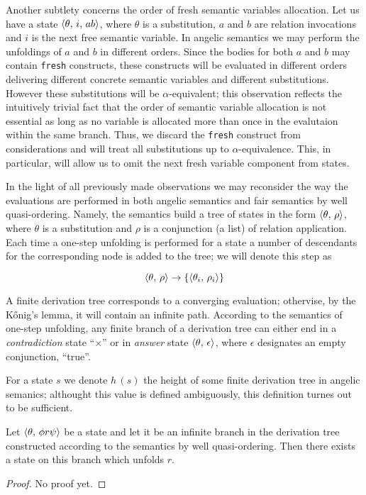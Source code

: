 Another subtlety concerns the order of fresh semantic variables allocation. Let us have a state $\langle \theta,\,i,\,ab \rangle$, where
$\theta$ is a substitution, $a$ and $b$ are relation invocations and $i$ is the next free semantic variable. In angelic semantics we
may perform the unfoldings of $a$ and $b$ in different orders. Since the bodies for both $a$ and $b$ may contain \lstinline|fresh| constructs,
these constructs will be evaluated in different orders delivering different concrete semantic variables and different substitutions. However
these substitutions will be $\alpha$-equivalent; this observation reflects the intuitively trivial fact that the order of semantic variable
allocation is not essential as long as no variable is allocated more than once in the evalutaion within the same branch. Thus, we discard
the \lstinline|fresh| construct from considerations and will treat all substitutions up to $\alpha$-equivalence. This, in particular,
will allow us to omit the next fresh variable component from states.

In the light of all previously made observations we may reconsider the way the evaluations are performed in both
angelic semantics and fair semantics by well quasi-ordering. Namely, the semantics build a tree of states in the form
$\langle \theta,\,\rho \rangle$, where $\theta$ is a substitution and $\rho$ is a conjunction (a list) of relation application.
Each time a one-step unfolding is performed for a state a number of descendants for the corresponding node is
added to the tree; we will denote this step as

\[
\langle \theta,\,\rho \rangle\to\{\langle \theta_i,\,\rho_i \rangle\}
\]

A finite derivation tree corresponds to a converging evaluation; othervise, by the K\H{o}nig's lemma, it will contain an infinite path. 
According to the semantics of one-step unfolding, any finite branch of a derivation tree can either end in a \emph{contradiction} state ``$\times$''
or in \emph{answer} state $\langle \theta,\,\epsilon \rangle$, where $\epsilon$ designates an empty conjunction, ``true''.

For a state $s$ we denote $h\,(s)$ the height of some finite derivation tree in angelic semanics; althought this value is defined ambiguously, this
definition turnes out to be sufficient.

\begin{lemma}
  \label{lem:liveness}
  Let $\langle \theta,\,\phi r \psi \rangle$ be a state and let it be an infinite branch in the derivation tree constructed according to the semantics by well
  quasi-ordering. Then there exists a state on this branch which unfolds $r$.
\end{lemma}
\begin{proof}
  No proof yet.
\end{proof}

